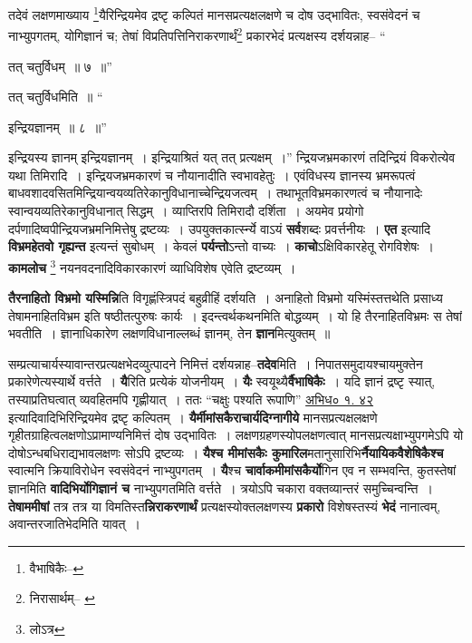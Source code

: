 \documentclass[article,12pt,a4paper]{memoir}
\begin{document}
	तदेवं लक्षणमाख्याय \footnote{वैभाषिकैः--\cite{dp-msD-n}}यैरिन्द्रियमेव द्रष्टृ कल्पितं मानसप्रत्यक्षलक्षणे च दोष उद्भावितः, स्वसंवेदनं च नाभ्युपगतम्, योगिज्ञानं च; तेषां विप्रतिपत्तिनिराकरणार्थं\footnote{निरासार्थम्--\cite{dp-msB} \cite{dp-msC} \cite{dp-msD}} प्रकारभेदं प्रत्यक्षस्य दर्शयन्नाह-- “
	  
	तत् चतुर्विधम् ॥ ७ ॥” 
	  
	तत् चतुर्विधमिति ॥ “
	  
	इन्द्रियज्ञानम् ॥ ८ ॥” 
	  
	इन्द्रियस्य ज्ञानम् इन्द्रियज्ञानम् । इन्द्रियाश्रितं यत् तत् प्रत्यक्षम् ।” न्द्रियजभ्रमकारणं तदिन्द्रियं विकरोत्येव यथा तिमिरादि । इन्द्रियजभ्रमकारणं च नौयानादीति स्वभावहेतुः । एवंविधस्य ज्ञानस्य भ्रमरूपत्वं बाधवशादवसितमिन्द्रियान्वयव्यतिरेकानुविधानाच्चेन्द्रियजत्वम् । तथाभूतविभ्रमकारणत्वं च नौयानादेः स्वान्वयव्यतिरेकानुविधानात् सिद्धम् । व्याप्तिरपि तिमिरादौ दर्शिता । अयमेव प्रयोगो दर्पणादिष्वपीन्द्रियजभ्रमनिमित्तेषु द्रष्टव्यः । उपयुक्तकार्त्स्न्ये वाऽयं \textbf{सर्व}शब्दः प्रवर्त्तनीयः । \textbf{एत} इत्यादि \textbf{विभ्रमहेतवो गृह्यन्त} इत्यन्तं सुबोधम् । केवलं \textbf{पर्यन्तो}ऽन्तो वाच्यः । \textbf{काचो}ऽक्षिविकारहेतू रोगविशेषः । \textbf{कामलोच} \footnote{लोऽत्र} नयनवदनादिविकारकारणं व्याधिविशेष एवेति द्रष्टव्यम् ।
	\pend
      

	  \pstart \textbf{तैरनाहितो विभ्रमो यस्मिन्नि}ति विगृह्णंस्त्रिपदं बहुव्रीहिं दर्शयति । अनाहितो विभ्रमो यस्मिंस्तत्तथेति प्रसाध्य तेषामनाहितविभ्रम इति षष्ठीतत्पुरुषः कार्यः । इदन्त्वर्थकथनमिति बोद्धव्यम् । यो हि तैरनाहितविभ्रमः स तेषां भवतीति । ज्ञानाधिकारेण लक्षणविधानाल्लब्धं ज्ञानम्, तेन \textbf{ज्ञान}मित्युक्तम् ॥
	\pend
      

	  \pstart सम्प्रत्याचार्यस्यावान्तरप्रत्यक्षभेदव्युत्पादने निमित्तं दर्शयन्नाह--\textbf{तदेव}मिति । निपातसमुदायश्चायमुक्तेन प्रकारेणेत्यस्यार्थे वर्त्तते । \textbf{यै}रिति प्रत्येकं योजनीयम् । \textbf{यैः} स्वयूथ्यै\textbf{र्वैभाषिकैः} । यदि ज्ञानं द्रष्टृ स्यात्, तस्याप्रतिघत्वात् व्यवहितमपि गृह्णीयात् । ततः “चक्षुः पश्यति रूपाणि” \href{http://http://sarit.indology.info/?cref=ak.1.42}{अभिध० १. ४२} इत्यादिवादिभिरिन्द्रियमेव द्रष्टृ कल्पितम् । \textbf{यैर्मीमांसकैराचार्यदिग्नागीये} मानसप्रत्यक्षलक्षणे गृहीतग्राहित्वलक्षणोऽप्रामाण्यनिमित्तं दोष उद्भावितः । लक्षणग्रहणस्योपलक्षणत्वात् मानसप्रत्यक्षाभ्युपगमेऽपि यो दोषोऽन्धबधिराद्यभावलक्षणः सोऽपि द्रष्टव्यः । \textbf{यैश्च मीमांसकैः कुमारिल}मतानुसारिभि\textbf{र्नैयायिकवैशेषिकैश्च} स्वात्मनि क्रियाविरोधेन स्वसंवेदनं नाभ्युपगतम् । \textbf{यै}श्च \textbf{चार्वाकमीमांसकैर्यो}गिन एव न सम्भवन्ति, कुतस्तेषां ज्ञानमिति \textbf{वादिभिर्योगिज्ञानं च} नाभ्युपगतमिति वर्त्तते । त्रयोऽपि चकारा वक्तव्यान्तरं समुच्चिन्वन्ति । \textbf{तेषाममीषां} तत्र तत्र या विमतिस्त\textbf{न्निराकरणार्थं} प्रत्यक्षस्योक्तलक्षणस्य \textbf{प्रकारो} विशेषस्तस्यं \textbf{भेदं} नानात्वम्, अवान्तरजातिभेदमिति यावत् ।
	\pend
      
\end{document}

